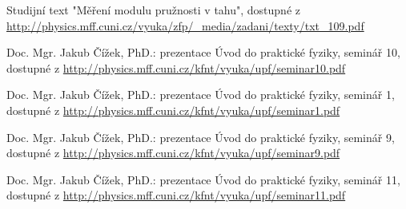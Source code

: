 \documentclass[protokol.tex]{subfiles}
\begin{document}
\begin{thebibliography}{}

Studijní text "Měření modulu pružnosti v tahu", dostupné z\\ \url{http://physics.mff.cuni.cz/vyuka/zfp/_media/zadani/texty/txt_109.pdf}

Doc. Mgr. Jakub Čížek, PhD.: prezentace Úvod do praktické fyziky, seminář 10, dostupné z \url{http://physics.mff.cuni.cz/kfnt/vyuka/upf/seminar10.pdf}

Doc. Mgr. Jakub Čížek, PhD.: prezentace Úvod do praktické fyziky, seminář 1, dostupné z \url{http://physics.mff.cuni.cz/kfnt/vyuka/upf/seminar1.pdf}

Doc. Mgr. Jakub Čížek, PhD.: prezentace Úvod do praktické fyziky, seminář 9, dostupné z \url{http://physics.mff.cuni.cz/kfnt/vyuka/upf/seminar9.pdf}

Doc. Mgr. Jakub Čížek, PhD.: prezentace Úvod do praktické fyziky, seminář 11, dostupné z \url{http://physics.mff.cuni.cz/kfnt/vyuka/upf/seminar11.pdf}

\end{thebibliography}
\end{document}
